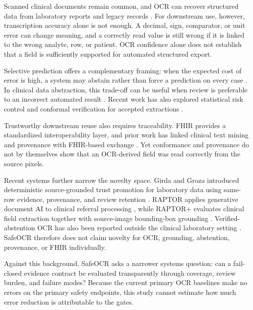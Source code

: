 \documentclass[10pt]{article}
\begin{document}
Scanned clinical documents remain common, and OCR can recover structured data from laboratory reports and legacy records \cite{ma2023labocr,li2024tabular,hsu2022scanned}. For downstream use, however, transcription accuracy alone is not enough. A decimal, sign, comparator, or unit error can change meaning, and a correctly read value is still wrong if it is linked to the wrong analyte, row, or patient. OCR confidence alone does not establish that a field is sufficiently supported for automated structured export.

Selective prediction offers a complementary framing: when the expected cost of error is high, a system may abstain rather than force a prediction on every case \cite{geifman2019selectivenet}. In clinical data abstraction, this trade-off can be useful when review is preferable to an incorrect automated result \cite{swaminathan2024selective}. Recent work has also explored statistical risk control and conformal verification for accepted extractions \cite{angelopoulos2025learntest,kim2025conformalEHR}.

Trustworthy downstream reuse also requires traceability. FHIR provides a standardized interoperability layer, and prior work has linked clinical text mining and provenance with FHIR-based exchange \cite{daumke2019fhir,margheri2020provenance}. Yet conformance and provenance do not by themselves show that an OCR-derived field was read correctly from the source pixels.

Recent systems further narrow the novelty space. Girda and Groza introduced deterministic source-grounded trust promotion for laboratory data using same-row evidence, provenance, and review retention \cite{girda2026review}. RAPTOR applies generative document AI to clinical referral processing \cite{abioye2025raptor}, while RAPTOR+ evaluates clinical field extraction together with source-image bounding-box grounding \cite{abioye2026raptorplus}. Verified-abstention OCR has also been reported outside the clinical laboratory setting \cite{benhmida2025ontology}. SafeOCR therefore does not claim novelty for OCR, grounding, abstention, provenance, or FHIR individually.

Against this background, SafeOCR asks a narrower systems question: can a fail-closed evidence contract be evaluated transparently through coverage, review burden, and failure modes? Because the current primary OCR baselines make no errors on the primary safety endpoints, this study cannot estimate how much error reduction is attributable to the gates.
\end{document}
